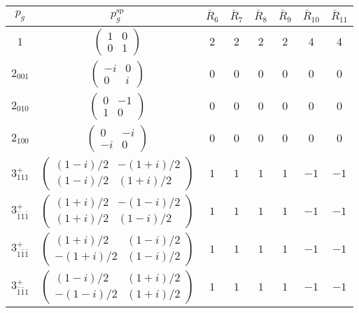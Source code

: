 \documentclass[3p,preprint]{elsarticle}
\begin{document}
\begin{table}[H]
	\begin{tabular}{|c|c||c|c|c|c|c|c|}\hline
		$p_g$ & $p_g^{\text{sp}}$ & $\bar{R}_6$ & $\bar{R}_7$ & $\bar{R}_8$ & $\bar{R}_9$ & $\bar{R}_{10}$ & $\bar{R}_{11}$  \\ \hline \hline
			$1$ & 				$\left(\begin{array}{cc} 1&0 \\ 0&1 \end{array}\right)$	& $2$ &  $2$ &  $2$ &  $2$ &  $4$ &  $4$ \\ \hline
			$2_{001}$ &		$\left(\begin{array}{cc} -i&0 \\ 0&i \end{array}\right)$	& $0$ & $0$ & $0$ & $0$ & $0$ & $0$ \\ \hline
			$2_{010}$ &		$\left(\begin{array}{cc} 0&-1 \\ 1&0 \end{array}\right)$	&$0$ & $0$ & $0$ & $0$ & $0$ & $0$ \\ \hline
			$2_{100}$ &		$\left(\begin{array}{cc} 0&-i \\ -i&0 \end{array}\right)$	& $0$ & $0$ & $0$ & $0$ & $0$ & $0$ \\ \hline
			$3^{+}_{111}$ &		$\left(\begin{array}{cc} (1-i)/2&-(1+i)/2 \\ (1-i)/2&(1+i)/2 \end{array}\right)$	&$1$ & $1$ & $1$ & $1$ & $-1$ & $-1$ \\ \hline
			$3^{+}_{\bar{1}1\bar{1}}$ &		$\left(\begin{array}{cc} (1+i)/2&-(1-i)/2 \\ (1+i)/2&(1-i)/2 \end{array}\right)$	&$1$ & $1$ & $1$ & $1$ & $-1$ & $-1$ \\ \hline
			$3^{+}_{1\bar{1}\bar{1}}$ &		$\left(\begin{array}{cc} (1+i)/2&(1-i)/2 \\ -(1+i)/2&(1-i)/2 \end{array}\right)$	& $1$ & $1$ & $1$ & $1$ & $-1$ & $-1$ \\ \hline
			$3^{+}_{\bar{1}\bar{1}1}$ &		$\left(\begin{array}{cc} (1-i)/2&(1+i)/2 \\ -(1-i)/2&(1+i)/2 \end{array}\right)$	&$1$ & $1$ & $1$ & $1$ & $-1$ & $-1$ \\ \hline

\end{tabular}
\end{table}
\end{document}
